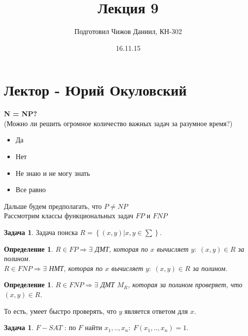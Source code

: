 \documentclass{beamer}
\title{Лекция 9}
\author{Подготовил Чижов Даниил, КН-302}
\theoremstyle{plain}
\newtheorem{dfn}[thm]{Определение}
\theoremstyle{definition}
\newtheorem{prob-rus}[thm]{Задача}
\begin{document}
\date{16.11.15}



\section{Лектор - Юрий Окуловский}

\begin{frame}
    \begin{center}
        \textbf{N = NP?} \\
        (Можно ли решить огромное количество важных задач за разумное время?)
    \end{center}
\end{frame}

\begin{frame}
    \begin{itemize}
        \item { Да }
        \item { Нет }
        \item { Не знаю и не могу знать }
        \item { Все равно }
    \end{itemize}
\end{frame}

\begin{frame}
    Дальше будем предполагать, что $P\neq NP$ \\
    Рассмотрим классы функциональных задач $FP$ и $FNP$
    \begin{prob-rus}
        Задача поиска $R=\left \{ (x,y)|x,y \in \sum \right \}$.
    \end{prob-rus}
    \begin{dfn}
        $R \in FP \Rightarrow \exists$ ДМТ, которая по $x$ вычисляет $y: \; (x,y) \in R$ за полином. \\
        $R \in FNP \Rightarrow \exists$ НМТ, которая по $x$ вычисляет $y: \; (x,y) \in R$ за полином.
    \end{dfn}
\end{frame}
    
\begin{frame}
    \begin{dfn}
        $R \in FNP \Rightarrow \exists$ ДМТ $M_{R}$, которая за полином проверяет, что $(x,y) \in R$.
    \end{dfn}
    То есть, умеет быстро проверять, что $y$ является ответом для $x$.
    \begin{prob-rus}
        $F-SAT$ : по $F$ найти $x_{1}, .., x_{n}: \; F(x_{1}, .., x_{n})=1$.
    \end{prob-rus}
\end{frame}
\end{document}
